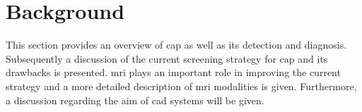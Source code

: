 \section{Background} \label{sec:background}

This section provides an overview of \ac{cap} as well as its detection and diagnosis. %
Subsequently a discussion of the current screening strategy for \ac{cap} and its drawbacks is presented. \ac{mri} plays an important role in improving the current strategy and a more detailed description of \ac{mri} modalities is given. Furthermore, a discussion regarding the aim of \ac{cad} systems will be given.


